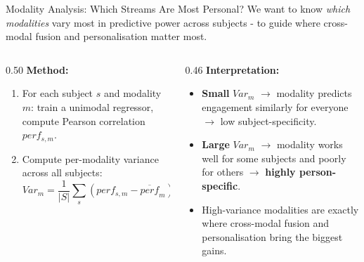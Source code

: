 \documentclass[aspectratio=169]{beamer}
\newcommand{\hl}[1]{\textcolor{coolpurple}{\textbf{#1}}}
\begin{document}
	\begin{frame}{Modality Analysis: Which Streams Are Most Personal?}
		We want to know \textit{which modalities} vary most in predictive power across subjects - to guide where cross-modal fusion and personalisation matter most.
		\vspace{0.4em}
		\begin{columns}
			\begin{column}{0.50\textwidth}
				\textbf{Method:}
				\begin{enumerate}
					\item For each subject $s$ and modality $m$: train a unimodal regressor, compute Pearson correlation $perf_{s,m}$.
					\item Compute per-modality variance across all subjects:
					$$Var_m = \frac{1}{|S|} \sum_s (perf_{s,m} - \overline{perf}_m)^2$$
				\end{enumerate}
				
			\end{column}
			\begin{column}{0.46\textwidth}
				\textbf{Interpretation:}
				\vspace{0.3em}
				\begin{itemize}
					\item \textbf{Small} $Var_m$ $\to$ modality predicts engagement similarly for everyone $\to$ low subject-specificity.
					\vspace{0.4em}
					\item \textbf{Large} $Var_m$ $\to$ modality works well for some subjects and poorly for others $\to$ \hl{highly person-specific}.
					\vspace{0.4em}
					\item High-variance modalities are exactly where cross-modal fusion and personalisation bring the biggest gains.
				\end{itemize}
			\end{column}
		\end{columns}
	\end{frame}
	
\end{document}
